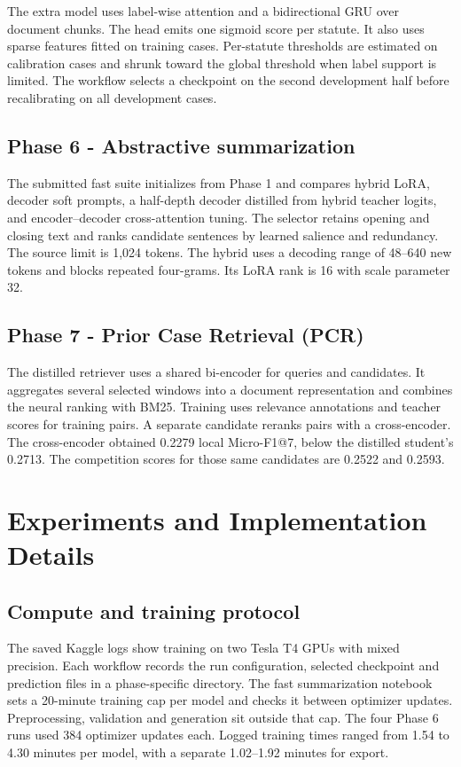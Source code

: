 \documentclass[11pt, oneside]{article}
\begin{document}
The extra model uses label-wise attention and a bidirectional GRU over document chunks. The head emits one sigmoid score per statute. It also uses sparse features fitted on training cases. Per-statute thresholds are estimated on calibration cases and shrunk toward the global threshold when label support is limited. The workflow selects a checkpoint on the second development half before recalibrating on all development cases.

\subsection{Phase 6 - Abstractive summarization}

The submitted fast suite initializes from Phase 1 and compares hybrid LoRA, decoder soft prompts, a half-depth decoder distilled from hybrid teacher logits, and encoder--decoder cross-attention tuning. The selector retains opening and closing text and ranks candidate sentences by learned salience and redundancy. The source limit is 1,024 tokens. The hybrid uses a decoding range of 48--640 new tokens and blocks repeated four-grams. Its LoRA rank is 16 with scale parameter 32.

\subsection{Phase 7 - Prior Case Retrieval (PCR)}

The distilled retriever uses a shared bi-encoder for queries and candidates. It aggregates several selected windows into a document representation and combines the neural ranking with BM25. Training uses relevance annotations and teacher scores for training pairs. A separate candidate reranks pairs with a cross-encoder. The cross-encoder obtained 0.2279 local Micro-F1@7, below the distilled student's 0.2713. The competition scores for those same candidates are 0.2522 and 0.2593.

\section{Experiments and Implementation Details}
\subsection{Compute and training protocol}

The saved Kaggle logs show training on two Tesla T4 GPUs with mixed precision. Each workflow records the run configuration, selected checkpoint and prediction files in a phase-specific directory. The fast summarization notebook sets a 20-minute training cap per model and checks it between optimizer updates. Preprocessing, validation and generation sit outside that cap. The four Phase 6 runs used 384 optimizer updates each. Logged training times ranged from 1.54 to 4.30 minutes per model, with a separate 1.02--1.92 minutes for export.
\end{document}
